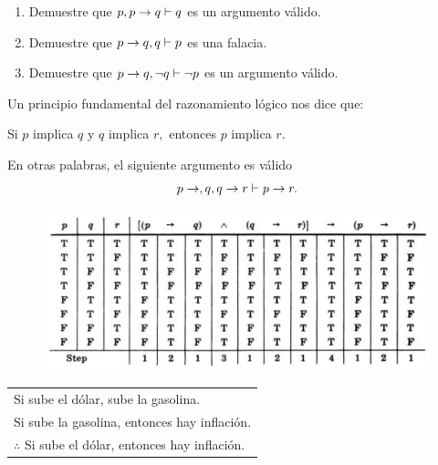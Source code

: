  \begin{problema}
 \label{lip:exmp:4.4}
  \begin{enumerate}
   \item Demuestre que $p, p\rightarrow q \vdash q$ es un argumento v\'alido. 
   \item Demuestre que $p\rightarrow q, q \vdash p$ es una falacia.
   
   \item Demuestre que $p\rightarrow q, \neg q \vdash \neg p$ es un argumento v\'alido.
  \end{enumerate}

 \end{problema}




 \begin{problema}
  Un principio fundamental del razonamiento l\'ogico nos dice que:
  \begin{center}
   Si $p$ implica $q$ y $q$ implica $r,$ entonces $p$ implica $r.$ 
  \end{center}


En otras palabras, el siguiente argumento es v\'alido
$$
p\rightarrow,q, q\rightarrow r \vdash p \rightarrow r.
$$ 
 \end{problema}

\begin{figure}
	\centering
	\includegraphics[width=0.7\linewidth]{md/tabla_silogismo}
	\caption{}
	\label{fig:tabla_silogismo}
\end{figure}


\begin{problema}
  \begin{center}
\begin{tabular}{l}
Si sube el d\'olar, sube la gasolina.\\
Si sube la gasolina, entonces hay inflaci\'on.\\\hline
$\therefore$ Si sube el d\'olar, entonces hay inflaci\'on.
 \end{tabular}
 \end{center}
\end{problema}


